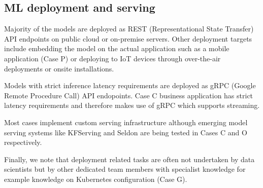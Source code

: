 

\subsection{ML deployment and serving}
Majority of the models are deployed as REST (Representational State Transfer) API endpoints on public cloud or on-premise servers. Other deployment targets include embedding the model on the actual application such as a mobile application (Case P) or deploying to IoT devices through over-the-air deployments or onsite installations.

Models with strict inference latency requirements are deployed as gRPC (Google Remote Procedure Call) API endopoints. Case C business application has strict latency requirements and therefore makes use of gRPC which supports streaming. %

Most cases implement custom serving infrastructure although emerging model serving systems like KFServing and Seldon are being tested in Cases C and O respectively. 

Finally, we note that deployment related tasks are often not undertaken by data scientists but by other dedicated team members with specialist knowledge for example knowledge on Kubernetes configuration (Case G).




